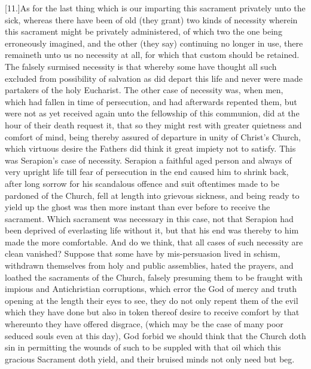 [11.]As for the last thing which is our imparting this sacrament privately unto the sick, whereas there have been of old (they grant) two kinds of necessity wherein this sacrament might be privately administered, of which two  the one being erroneously imagined, and the other (they say) continuing no longer in use, there remaineth unto us no necessity at all, for which that custom should be retained. The falsely surmised necessity is that whereby some have thought all such excluded from possibility of salvation as did depart this life and never were made partakers of the holy Eucharist. The other case of necessity was, when men, which had fallen in time of persecution, and had afterwards repented them, but were not as yet received again unto the fellowship of this communion, did at the hour of their death request it, that so they might rest with greater quietness and comfort of mind, being thereby assured of departure in unity of Christ’s Church, which virtuous desire the Fathers did think it great impiety not to satisfy. This was Serapion’s case of necessity. Serapion a faithful aged person and always of very upright life till fear of persecution in the end caused him to shrink back, after long sorrow for his scandalous offence and suit oftentimes made to be pardoned of the Church, fell at length into grievous sickness, and being ready to yield up the ghost was then more instant than ever before to receive the sacrament. Which sacrament was necessary in this case, not that Serapion had been deprived of everlasting life without it, but that his end was thereby to him made the more comfortable. And do we think, that all cases of such  necessity are clean vanished?
 Suppose that some have by mis-persuasion lived in schism, withdrawn themselves from holy and public assemblies, hated the prayers, and loathed the sacraments of the Church, falsely presuming them to be fraught with impious and Antichristian corruptions, which error the God of mercy and truth opening at the length their eyes to see, they do not only repent them of the evil which they have done but also in token thereof desire to receive comfort by that whereunto they have offered disgrace, (which may be the case of many poor seduced souls even at this day), God forbid we should think that the Church doth sin in permitting the wounds of such to be suppled with that oil which this gracious Sacrament doth yield, and their bruised minds not only need but beg.

